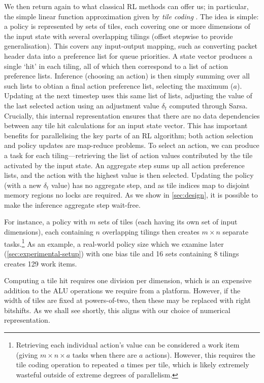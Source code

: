 \documentclass[sigconf,natbib=false]{acmart}
\begin{document}
We then return again to what classical RL methods can offer us; in particular, the simple linear function approximation given by \emph{tile coding} \cite[pp.\ \numrange{217}{221}]{RL2E}.
The idea is simple: a policy is represented by sets of tiles, each covering one or more dimensions of the input state with several overlapping tilings (offset stepwise to provide generalisation).
This covers any input-output mapping, such as converting packet header data into a preference list for queue priorities.
A state vector produces a single `hit' in each tiling, all of which then correspond to a list of action preference lists.
Inference (choosing an action) is then simply summing over all such lists to obtian a final action preference list, selecting the maximum ($a$).
Updating at the next timestep uses this same list of lists, adjusting the value of the last selected action using an adjustment value $\delta_t$ computed through Sarsa.
Crucially, this internal representation ensures that there are no data dependencies between any tile hit calculations for an input state vector.
This has important benefits for parallelising the key parts of an RL algorithm; both action selection and policy updates are map-reduce problems.
To select an action, we can produce a task for each tiling---retrieving the list of action values contributed by the tile activated by the input state.
An aggregate step sums up all action preference lists, and the action with the highest value is then selected.
Updating the policy (with a new $\delta_t$ value) has no aggregate step, and as tile indices map to disjoint memory regions no locks are required.
As we show in \cref{sec:design}, it is possible to make the inference aggregate step wait-free.

For instance, a policy with $m$ sets of tiles (each having its own set of input dimensions), each containing $n$ overlapping tilings then creates $m \times n$ separate tasks.\footnote{Retrieving each individual action's value can be considered a work item (giving $m \times n \times a$ tasks when there are $a$ actions). However, this requires the tile coding operation to repeated $a$ times per tile, which is likely extremely wasteful outside of extreme degrees of parallelism.}
As an example, a real-world policy size which we examine later (\cref{sec:experimental-setup}) with one bias tile and \num{16} sets containing \num{8} tilings creates \num{129} work items.

Computing a tile hit requires one division per dimension, which is an expensive addition to the ALU operations we require from a platform.
However, if the width of tiles are fixed at powers-of-two, then these may be replaced with right bitshifts.
As we shall see shortly, this aligns with our choice of numerical representation.
\end{document}
